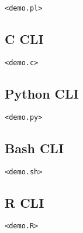 \documentclass{article}
\begin{document}
\begin{verbatim}
<demo.pl>
\end{verbatim}

\subsection{C CLI}

\begin{verbatim}
<demo.c>
\end{verbatim}

\subsection{Python CLI}

\begin{verbatim}
<demo.py>
\end{verbatim}

\subsection{Bash CLI}

\begin{verbatim}
<demo.sh>
\end{verbatim}

\subsection{R CLI}

\begin{verbatim}
<demo.R>
\end{verbatim}
\end{document}
